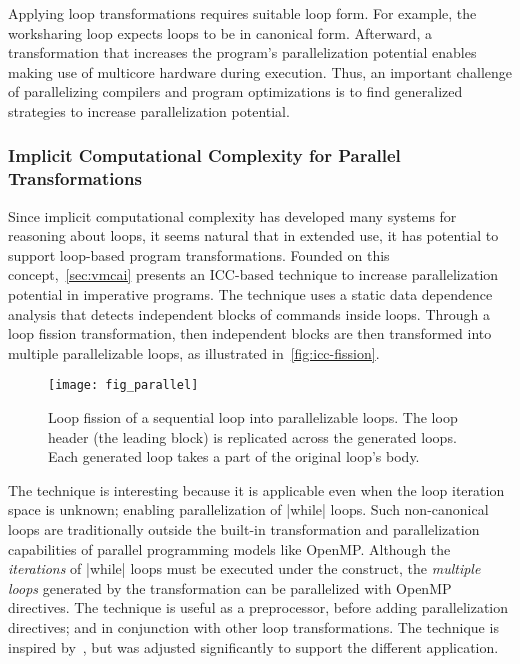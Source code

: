 Applying loop transformations requires suitable loop form.
For example, the worksharing loop expects loops to be in canonical form.
Afterward, a transformation that increases the program's parallelization potential enables making use of multicore hardware during execution.
Thus, an important challenge of parallelizing compilers and program optimizations is to find generalized strategies to increase parallelization potential.

\subsubsection{Implicit Computational Complexity for Parallel Transformations}
\label{icc-fission}

Since implicit computational complexity has developed many systems for reasoning about loops, it seems natural that in extended use, it has potential to support loop-based program transformations.
Founded on this concept,~\autoref{sec:vmcai} presents an ICC-based technique to increase parallelization potential in imperative programs.
The technique uses a static data dependence analysis that detects independent blocks of commands inside loops.
Through a loop fission transformation,
then independent blocks are then transformed into multiple parallelizable loops, as illustrated in~\autoref{fig:icc-fission}.

\begin{figure}[h]
{\centering\texttt{[image: fig\_parallel]}}
\caption[Loop fission transformation]
{Loop fission of a sequential loop into parallelizable loops.
The loop header (the leading  block) is replicated across the generated loops.
Each generated loop takes a part of the original loop's body.}\label{fig:icc-fission}
\end{figure}

The technique is interesting because it is applicable even when the loop iteration space is unknown;
enabling parallelization of \eg \pr|while| loops.
Such non-canonical loops are traditionally outside the built-in transformation and parallelization capabilities of parallel programming models like OpenMP\@.
Although the \emph{iterations} of \pr|while| loops must be executed under the  construct,
the \emph{multiple loops} generated by the transformation can be parallelized with OpenMP directives.
The technique is useful as a preprocessor, before adding parallelization directives;
and in conjunction with other loop transformations.
The technique is inspired by~\cite{moyen20172}, but was adjusted significantly to support the different application.

